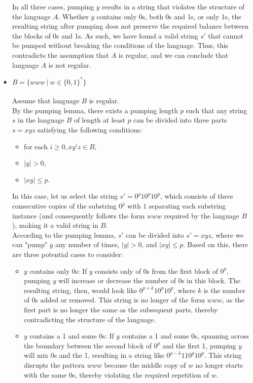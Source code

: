 \documentclass[12pt]{article}
\begin{document}
\begin{itemize}
In all three cases, pumping $y$ results in a string that violates the structure of the language $A$. Whether $y$ contains only 0s, both 0s and 1s, or only 1s, the resulting string after pumping does not preserve the required balance between the blocks of 0s and 1s. As such, we have found a valid string $s'$ that cannot be pumped without breaking the conditions of the language. Thus, this contradicts the assumption that $A$ is regular, and we can conclude that language $A$ is not regular.

	\item $B= \{ www \ | \ w \in \{0,1\}^* \}$\\
\\
Assume that language $B$ is regular.\\

By the pumping lemma, there exists a pumping length $p$ such that any string $s$ in the language $B$ of length at least $p$ can be divided into three parts $s = xyz$ satisfying the following conditions:
\begin{itemize}
    \item for each $i \geq 0, xy^iz \in B$,
    \item $|y| > 0$,
    \item $|xy| \leq p$.
\end{itemize}

In this case, let us select the string $s' = 0^p10^p10^p$, which consists of three consecutive copies of the substring $0^p$ with $1$ separating each substring instance (and consequently follows the form $www$ required by the language $B$), making it a valid string in $B$.\\

According to the pumping lemma, $s'$ can be divided into $s' = xyz$, where we can "pump" $y$ any number of times, $|y| > 0$, and $|xy| \leq p$. Based on this, there are three potential cases to consider:

\begin{itemize}
    \item $y$ contains only 0s: If $y$ consists only of 0s from the first block of $0^p$, pumping $y$ will increase or decrease the number of 0s in this block. The resulting string, then, would look like $0^{p+k}10^p10^p$, where $k$ is the number of 0s added or removed. This string is no longer of the form $www$, as the first part is no longer the same as the subsequent parts, thereby contradicting the structure of the language.
    
    \item $y$ contains a 1 and some 0s: If $y$ contains a 1 and some 0s, spanning across the boundary between the second block of $0^p$ and the first 1, pumping $y$ will mix 0s and the 1, resulting in a string like $0^{p-k}110^p10^p$. This string disrupts the pattern $www$ because the middle copy of $w$ no longer starts with the same 0s, thereby violating the required repetition of $w$.
    

\end{itemize}
\end{itemize}
\end{document}
